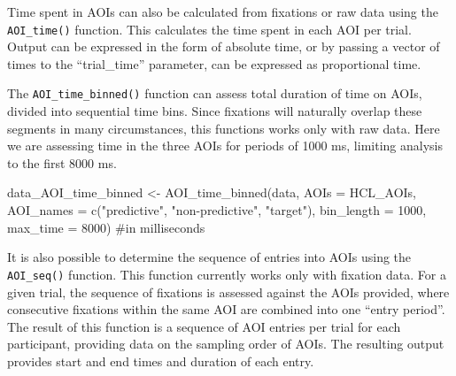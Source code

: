 \documentclass[
  man,
  floatsintext,
  longtable,
  nolmodern,
  notxfonts,
  notimes,
  colorlinks=true,linkcolor=blue,citecolor=blue,urlcolor=blue]{apa7}
\newenvironment{Shaded}{\begin{snugshade}}{\end{snugshade}}
\newcommand{\AttributeTok}[1]{\textcolor[rgb]{0.40,0.45,0.13}{#1}}
\newcommand{\CommentTok}[1]{\textcolor[rgb]{0.37,0.37,0.37}{#1}}
\newcommand{\ConstantTok}[1]{\textcolor[rgb]{0.56,0.35,0.01}{#1}}
\newcommand{\DecValTok}[1]{\textcolor[rgb]{0.68,0.00,0.00}{#1}}
\newcommand{\FunctionTok}[1]{\textcolor[rgb]{0.28,0.35,0.67}{#1}}
\newcommand{\NormalTok}[1]{\textcolor[rgb]{0.00,0.23,0.31}{#1}}
\newcommand{\OtherTok}[1]{\textcolor[rgb]{0.00,0.23,0.31}{#1}}
\newcommand{\SpecialCharTok}[1]{\textcolor[rgb]{0.37,0.37,0.37}{#1}}
\newcommand{\StringTok}[1]{\textcolor[rgb]{0.13,0.47,0.30}{#1}}
\begin{document}
Time spent in AOIs can also be calculated from fixations or raw data
using the \texttt{AOI\_time()} function. This calculates the time spent
in each AOI per trial. Output can be expressed in the form of absolute
time, or by passing a vector of times to the ``trial\_time'' parameter,
can be expressed as proportional time.

\begin{Shaded}
\end{Shaded}

The \texttt{AOI\_time\_binned()} function can assess total duration of
time on AOIs, divided into sequential time bins. Since fixations will
naturally overlap these segments in many circumstances, this functions
works only with raw data. Here we are assessing time in the three AOIs
for periods of 1000 ms, limiting analysis to the first 8000 ms.

\begin{Shaded}
\begin{Highlighting}[]
\NormalTok{data\_AOI\_time\_binned }\OtherTok{\textless{}{-}} 
  \FunctionTok{AOI\_time\_binned}\NormalTok{(data, }
                  \AttributeTok{AOIs =}\NormalTok{ HCL\_AOIs,}
                  \AttributeTok{AOI\_names =} \FunctionTok{c}\NormalTok{(}\StringTok{"predictive"}\NormalTok{, }\StringTok{"non{-}predictive"}\NormalTok{, }\StringTok{"target"}\NormalTok{),}
                  \AttributeTok{bin\_length =} \DecValTok{1000}\NormalTok{,}
                  \AttributeTok{max\_time =} \DecValTok{8000}\NormalTok{) }\CommentTok{\#in milliseconds}
\end{Highlighting}
\end{Shaded}

It is also possible to determine the sequence of entries into AOIs using
the \texttt{AOI\_seq()} function. This function currently works only
with fixation data. For a given trial, the sequence of fixations is
assessed against the AOIs provided, where consecutive fixations within
the same AOI are combined into one ``entry period''. The result of this
function is a sequence of AOI entries per trial for each participant,
providing data on the sampling order of AOIs. The resulting output
provides start and end times and duration of each entry.
\end{document}
